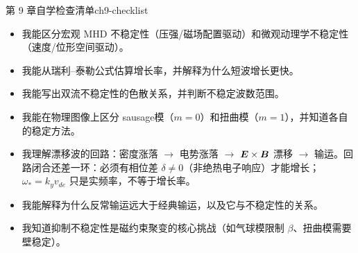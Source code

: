\begin{checklistbox}{第 9 章自学检查清单}{ch9-checklist}
\begin{itemize}[leftmargin=*,label=$\square$]
\item 我能区分宏观 MHD 不稳定性（压强/磁场配置驱动）和微观动理学不稳定性（速度/位形空间驱动）。
\item 我能从瑞利--泰勒公式估算增长率，并解释为什么短波增长更快。
\item 我能写出双流不稳定性的色散关系，并判断不稳定波数范围。
\item 我能在物理图像上区分 sausage模（$m=0$）和扭曲模（$m=1$），并知道各自的稳定方法。
\item 我理解漂移波的回路：密度涨落 $\to$ 电势涨落 $\to$ $\bm{E}\times\bm{B}$ 漂移 $\to$ 输运。回路闭合还差一环：必须有相位差 $\delta\neq0$（非绝热电子响应）才能增长；$\omega_*=k_yv_{de}$ 只是实频率，不等于增长率。
\item 我能解释为什么反常输运远大于经典输运，以及它与不稳定性的关系。
\item 我知道抑制不稳定性是磁约束聚变的核心挑战（如气球模限制 $\beta$、扭曲模需要壁稳定）。
\end{itemize}
\end{checklistbox}


\endinput
